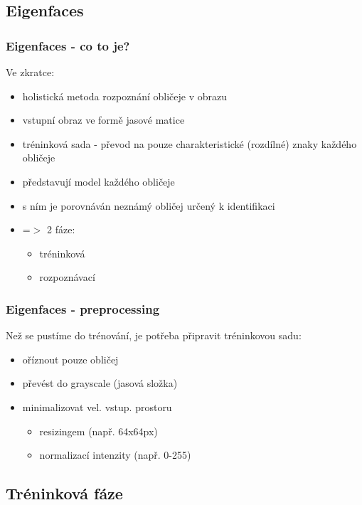 \documentclass{beamer}
\begin{document}
\subsection{Eigenfaces}
\begin{frame}
\frametitle{Eigenfaces - co to je?}
Ve zkratce:
\begin{itemize}
	\item holistická metoda rozpoznání obličeje v obrazu
	\item vstupní obraz ve formě jasové matice
	\item tréninková sada - převod na pouze charakteristické (rozdílné) znaky každého obličeje
	\item představují model každého obličeje
	\item s ním je porovnáván neznámý obličej určený k identifikaci
	\item =$>$ 2 fáze:
		\begin{itemize}
			\item tréninková
			\item rozpoznávací
		\end{itemize}
\end{itemize}
\end{frame}

\begin{frame}
\frametitle{Eigenfaces - preprocessing}
Než se pustíme do trénování, je potřeba připravit tréninkovou sadu:
\begin{itemize}
			\item oříznout pouze obličej
			\item převést do grayscale (jasová složka)
			\item minimalizovat vel. vstup. prostoru
				\begin{itemize}
					\item resizingem (např. 64x64px)
					\item normalizací intenzity (např. 0-255)
				\end{itemize}							
		\end{itemize}
\end{frame}

\subsection{Tréninková fáze}
\end{document}
